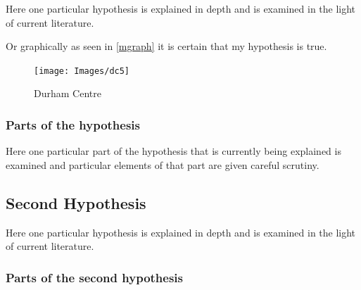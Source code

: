 Here one particular hypothesis is explained in depth
and is examined in the light of current literature.

Or graphically as seen in \autoref{mgraph}
it is certain that my hypothesis is true.

\begin{figure}[h!tb] \centering

    \texttt{[image: Images/dc5]}

    \caption{Durham Centre}
    \label{mgraph}
\end{figure}

\subsubsection{Parts of the hypothesis}

Here one particular part of the hypothesis that is
currently being explained is examined and particular
elements of that part are given careful scrutiny.


\subsection{Second Hypothesis}

Here one particular hypothesis is explained in depth
and is examined in the light of current literature.

\subsubsection{Parts of the second hypothesis}

